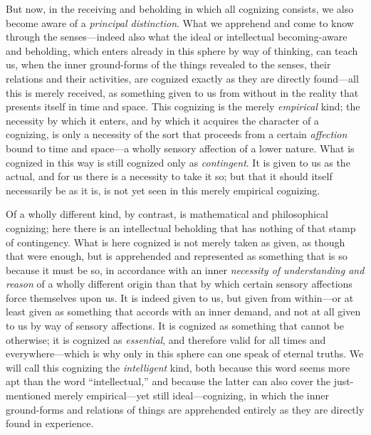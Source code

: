 \documentclass[12pt,a4paper]{book}
\begin{document}
But now, in the receiving and beholding in which all cognizing consists, we also
become aware of a \emph{principal distinction}. What we apprehend and come to
know through the senses---indeed also what the ideal or intellectual
becoming-aware and beholding, which enters already in this sphere by way of
thinking, can teach us, when the inner ground-forms of the things revealed to
the senses, their relations and their activities, are cognized exactly as they
are directly found---all this is merely received, as something given to us from
without in the reality that presents itself in time and space. This cognizing is
the merely \emph{empirical} kind; the necessity by which it enters, and by which
it acquires the character of a cognizing, is only a necessity of the sort that
proceeds from a certain \emph{affection} bound to time and space---a wholly
sensory affection of a lower nature. What is cognized in this way is still
cognized only as \emph{contingent}. It is given to us as the actual, and for us
there is a necessity to take it so; but that it should itself necessarily be as
it is, is not yet seen in this merely empirical cognizing.

Of a wholly different kind, by contrast, is mathematical and philosophical
cognizing; here there is an intellectual beholding that has nothing of that
stamp of contingency. What is here cognized is not merely taken as given, as
though that were enough, but is apprehended and represented as something that is
so because it must be so, in accordance with an inner \emph{necessity of
understanding and reason} of a wholly different origin than that by which
certain sensory affections force themselves upon us. It is indeed given to us,
but given from within---or at least given as something that accords with an
inner demand, and not at all given to us by way of sensory affections. It is
cognized as something that cannot be otherwise; it is cognized as
\emph{essential}, and therefore valid for all times and everywhere---which is
why only in this sphere can one speak of eternal truths. We will call this
cognizing the \emph{intelligent} kind, both because this word seems more apt
than the word ``intellectual,'' and because the latter can also cover the
just-mentioned merely empirical---yet still ideal---cognizing, in which the
inner ground-forms and relations of things are apprehended entirely as they are
directly found in experience.
\end{document}
